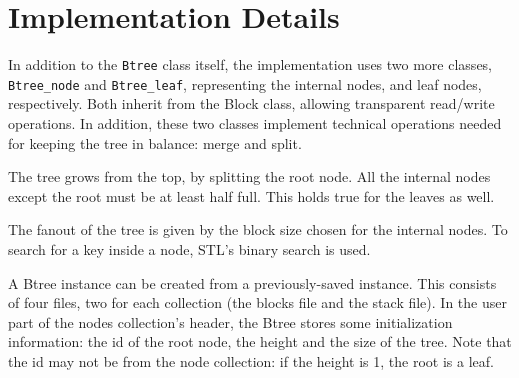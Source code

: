 \documentclass[11pt]{article}
\begin{document}
\section{Implementation Details}

In addition to the {\tt Btree} class itself, the implementation uses two
more classes, {\tt Btree\_node} and {\tt Btree\_leaf}, representing
the internal nodes, and leaf nodes, respectively. Both inherit from
the Block class, allowing transparent read/write operations. In
addition, these two classes implement technical operations needed for
keeping the tree in balance: merge and split. 

The tree grows from the top, by splitting the root node. All the
internal nodes except the root must be at least half full. This holds
true for the leaves as well.

The fanout of the tree is given by the block size chosen for the
internal nodes. To search for a key inside a node, STL's binary search
is used.

A Btree instance can be created from a previously-saved instance. This
consists of four files, two for each collection (the blocks file and
the stack file). In the user part of the nodes collection's header,
the Btree stores some initialization information: the id of the root
node, the height and the size of the tree. Note that the id may not be
from the node collection: if the height is 1, the root is a leaf.
\end{document}
